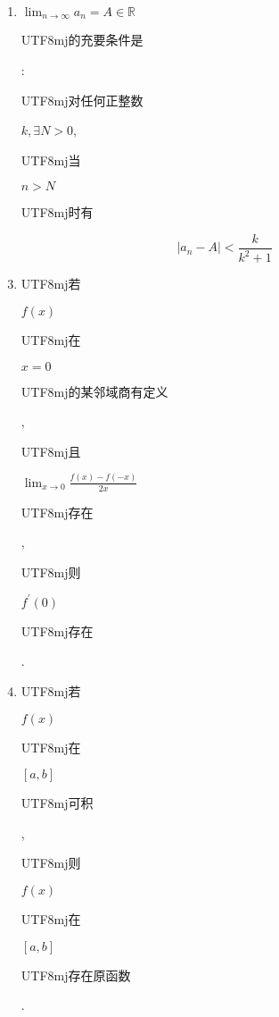 \documentclass[10pt]{article}
\begin{document}
\begin{enumerate}
  \item $\lim _{n \rightarrow \infty} a_{n}=A \in \mathbb{R}$ \begin{CJK}{UTF8}{mj}的充要条件是\end{CJK}: \begin{CJK}{UTF8}{mj}对任何正整数\end{CJK} $k, \exists N>0$, \begin{CJK}{UTF8}{mj}当\end{CJK} $n>N$ \begin{CJK}{UTF8}{mj}时有\end{CJK}
\end{enumerate}
$$
\left|a_{n}-A\right|<\frac{k}{k^{2}+1}
$$

\begin{enumerate}
  \setcounter{enumi}{2}
  \item \begin{CJK}{UTF8}{mj}若\end{CJK} $f(x)$ \begin{CJK}{UTF8}{mj}在\end{CJK} $x=0$ \begin{CJK}{UTF8}{mj}的某邻域商有定义\end{CJK}, \begin{CJK}{UTF8}{mj}且\end{CJK} $\lim _{x \rightarrow 0} \frac{f(x)-f(-x)}{2 x}$ \begin{CJK}{UTF8}{mj}存在\end{CJK}, \begin{CJK}{UTF8}{mj}则\end{CJK} $f^{\prime}(0)$ \begin{CJK}{UTF8}{mj}存在\end{CJK}.

  \item \begin{CJK}{UTF8}{mj}若\end{CJK} $f(x)$ \begin{CJK}{UTF8}{mj}在\end{CJK} $[a, b]$ \begin{CJK}{UTF8}{mj}可积\end{CJK}, \begin{CJK}{UTF8}{mj}则\end{CJK} $f(x)$ \begin{CJK}{UTF8}{mj}在\end{CJK} $[a, b]$ \begin{CJK}{UTF8}{mj}存在原函数\end{CJK}.


\end{enumerate}
\end{document}
